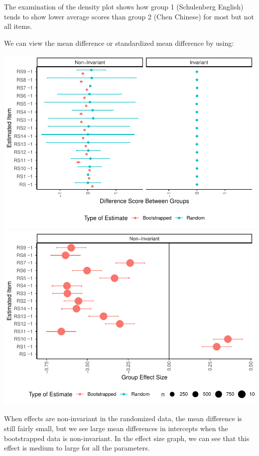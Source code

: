 \documentclass[
  man]{apa7}
\begin{document}
The examination of the density plot shows how group 1 (Schulenberg English) tends to show lower average scores than group 2 (Chen Chinese) for most but not all items.

We can view the mean difference or standardized mean difference by using:

\includegraphics{manuscript_files/figure-latex/unnamed-chunk-111-1.pdf} \includegraphics{manuscript_files/figure-latex/unnamed-chunk-111-2.pdf}

When effects are non-invariant in the randomized data, the mean difference is still fairly small, but we see large mean differences in intercepts when the bootstrapped data is non-invariant. In the effect size graph, we can see that this effect is medium to large for all the parameters.
\end{document}
